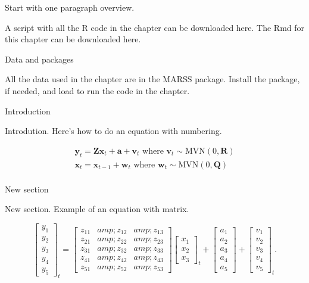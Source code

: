 \documentclass[
  12pt,
]{book}
\begin{document}
Start with one paragraph overview.

A script with all the R code in the chapter can be downloaded here. The Rmd for this chapter can be downloaded here.

\hypertarget{data-and-packages}{}
Data and packages

All the data used in the chapter are in the MARSS package. Install the package, if needed, and load to run the code in the chapter.

\hypertarget{sec-uss-intro}{}
Introduction

Introdution. Here's how to do an equation with numbering.

{\[\begin{equation}
\begin{gathered}
\mathbf{y}_t = \mathbf{Z}\mathbf{x}_t+\mathbf{a}+\mathbf{v}_t \text{ where } \mathbf{v}_t \sim \text{MVN}(0,\mathbf{R}) \\
\mathbf{x}_t = \mathbf{x}_{t-1}+\mathbf{w}_t \text{ where } \mathbf{w}_t \sim \text{MVN}(0,\mathbf{Q}) \\
\end{gathered}
\label{eq:template1}
\end{equation}\]}

\hypertarget{sec-uss-2}{}
New section

New section. Example of an equation with matrix.

{\[\begin{equation}
\begin{bmatrix}
    y_{1} \\
    y_{2} \\
    y_{3} \\
    y_{4} \\
    y_{5} \end{bmatrix}_t = 
 \begin{bmatrix}
    z_{11}&amp;z_{12}&amp;z_{13}\\
    z_{21}&amp;z_{22}&amp;z_{23}\\
    z_{31}&amp;z_{32}&amp;z_{33}\\
    z_{41}&amp;z_{42}&amp;z_{43}\\
    z_{51}&amp;z_{52}&amp;z_{53}\end{bmatrix}   
 \begin{bmatrix}
    x_{1} \\
    x_{2} \\
    x_{3} \end{bmatrix}_t + 
 \begin{bmatrix}
    a_1 \\
    a_2 \\
    a_3 \\
    a_4 \\
    a_5 \end{bmatrix} + 
 \begin{bmatrix}
    v_{1} \\
    v_{2} \\
    v_{3} \\
    v_{4} \\
    v_{5} \end{bmatrix}_t.
\label{eq:template2-y}
\end{equation}\]}
\end{document}
